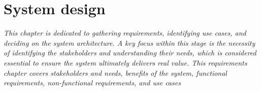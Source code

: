 \chapter{System design}
\indent\textit{This chapter is dedicated to gathering requirements, identifying use cases, and deciding on the system architecture. A key focus within this stage is the necessity of identifying the stakeholders and understanding their needs, which is considered essential to ensure the system ultimately delivers real value. This requirements chapter covers stakeholders and needs, benefits of the system, functional requirements, non-functional requirements, and use cases}

% 
% 










